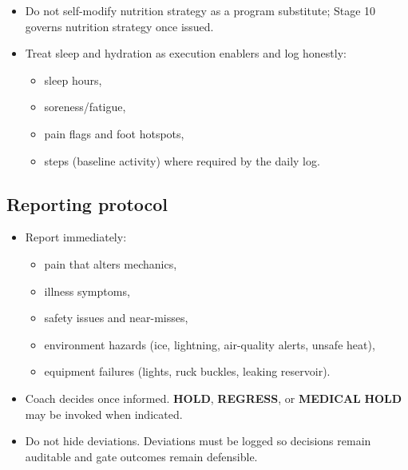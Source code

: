 \documentclass[10pt]{article}
\begin{document}
\begin{itemize}
\item Do not self-modify nutrition strategy as a program substitute; Stage 10 governs nutrition strategy once issued.
\item Treat sleep and hydration as execution enablers and log honestly:
  \begin{itemize}
  \item sleep hours,
  \item soreness/fatigue,
  \item pain flags and foot hotspots,
  \item steps (baseline activity) where required by the daily log.
  \end{itemize}
\end{itemize}

\subsection*{Reporting protocol}
{}

\begin{itemize}
\item Report immediately:
  \begin{itemize}
  \item pain that alters mechanics,
  \item illness symptoms,
  \item safety issues and near-misses,
  \item environment hazards (ice, lightning, air-quality alerts, unsafe heat),
  \item equipment failures (lights, ruck buckles, leaking reservoir).
  \end{itemize}
\item Coach decides once informed. \textbf{HOLD}, \textbf{REGRESS}, or \textbf{MEDICAL} \textbf{HOLD} may be invoked when indicated.
\item Do not hide deviations. Deviations must be logged so decisions remain auditable and gate outcomes remain defensible.
\end{itemize}
\end{document}

